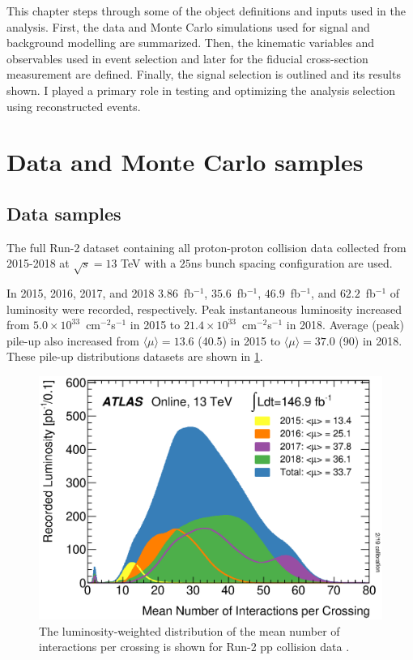 This chapter steps through some of the object definitions and inputs used in the analysis. First, the data and Monte Carlo simulations used for signal and background modelling are summarized. Then, the kinematic variables and observables used in event selection and later for the fiducial cross-section measurement are defined. Finally, the signal selection is outlined and its results shown. I played a primary role in testing and optimizing the analysis selection using reconstructed events.  

\section{Data and Monte Carlo samples}
\subsection{Data samples}

The full Run-2 dataset containing all proton-proton collision data collected from 2015-2018 at $\sqrt{s}=13$ TeV with a $25$ns bunch spacing configuration are used.

In 2015, 2016, 2017, and 2018 $3.86$~fb$^{-1}$, $35.6$~fb$^{-1}$, $46.9$~fb$^{-1}$, and  $62.2$~fb$^{-1}$ of luminosity were recorded, respectively. Peak instantaneous luminosity increased from $5.0\times 10^{33}$~cm$^{-2}$s$^{-1}$ in 2015 to $21.4\times 10^{33}$~cm$^{-2}$s$^{-1}$ in 2018. Average (peak) pile-up also increased from $\langle\mu\rangle=13.6$ (40.5) in 2015 to  $\langle\mu\rangle=37.0$ (90) in 2018. These pile-up distributions datasets are shown in \ref{fig:mu_profile}. 

\begin{figure}[!htbp]
    \centering 
    \includegraphics[width=0.55\linewidth]{Pictures/mu_2015_2018.eps}
    \caption{The luminosity-weighted distribution of the mean number of interactions per crossing is shown for Run-2 pp collision data \cite{lumigroup}. }
    \label{fig:mu_profile}
\end{figure}

